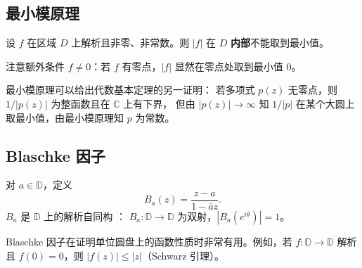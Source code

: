 \subsection{最小模原理}

\begin{theorem}
设 $f$ 在区域 $D$ 上解析且非零、非常数。则 $|f|$ 在 $D$ \textbf{内部}不能取到最小值。
\end{theorem}

\begin{remark}
注意额外条件 $f \neq 0$：若 $f$ 有零点，$|f|$ 显然在零点处取到最小值 $0$。

最小模原理可以给出代数基本定理的另一证明：
若多项式 $p(z)$ 无零点，则 $1/|p(z)|$ 为整函数且在 $\mathbb{C}$ 上有下界，
但由 $|p(z)| \to \infty$ 知 $1/|p|$ 在某个大圆上取最小值，由最小模原理知 $p$ 为常数。
\end{remark}

\subsection{Blaschke 因子}

\begin{definition}
对 $a \in \mathbb{D}$，定义
\[
  B_a(z) = \frac{z - a}{1 - \bar{a}z}.
\]
$B_a$ 是 $\mathbb{D}$ 上的解析自同构 ：
$B_a: \mathbb{D} \to \mathbb{D}$ 为双射，$|B_a(e^{i\theta})| = 1$。
\end{definition}

\begin{remark}
Blaschke 因子在证明单位圆盘上的函数性质时非常有用。例如，若 $f: \mathbb{D} \to \mathbb{D}$
解析且 $f(0) = 0$，则 $|f(z)| \leq |z|$（Schwarz 引理）。
\end{remark}
